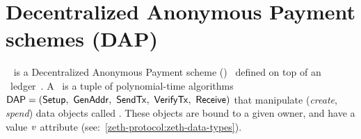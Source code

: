 
\section{Decentralized Anonymous Payment schemes (DAP)}\label{preliminaries:dap}

\zeth~\cite{zethpaper} is a Decentralized Anonymous Payment scheme (\dapscheme)~\cite[Section 3]{sasson2014zerocash} defined on top of an \ethereum~ledger~\ledger. A \dapscheme~is a tuple of polynomial-time algorithms $\dapscheme = (\setup,\ \genadd,\ \sendtx,\ \verifytx,\ \receive)$ that manipulate (\emph{create}, \emph{spend}) data objects called \notes. These objects are bound to a given owner, and have a value $\mathit{v}$ attribute (see:~\cref{zeth-protocol:zeth-data-types}).

